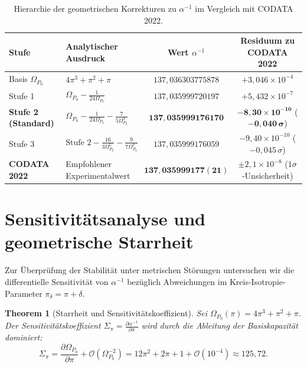 \documentclass[11pt,a4paper]{article}
\newtheorem{theorem}{Theorem}[section]
\begin{document}
\begin{table}[htbp]
\centering
\small
\caption{Hierarchie der geometrischen Korrekturen zu $\alpha^{-1}$ im Vergleich mit CODATA 2022.}
\label{tab:alpha_hierarchy}
\vspace{0.15cm}
\begin{tabular}{llcc}
\toprule
\textbf{Stufe} & \textbf{Analytischer Ausdruck} & \textbf{Wert $\alpha^{-1}$} & \textbf{Residuum zu CODATA 2022} \\
\midrule
Basis $\Omega_{P_0}$ & $4\pi^3 + \pi^2 + \pi$ & $137{,}036303775878$ & $+3{,}046 \times 10^{-4}$ \\
Stufe 1 & $\Omega_{P_0} - \frac{1}{24\Omega_{P_0}}$ & $137{,}035999720197$ & $+5{,}432 \times 10^{-7}$ \\
\textbf{Stufe 2 (Standard)} & $\Omega_{P_0} - \frac{1}{24\Omega_{P_0}} - \frac{7}{5\Omega_{P_0}^3}$ & $\mathbf{137{,}035999176170}$ & $\mathbf{-8{,}30 \times 10^{-10}}$ ($\mathbf{-0{,}040\,\sigma}$) \\
Stufe 3 & $\text{Stufe 2} - \frac{16}{3\Omega_{P_0}^5} - \frac{9}{7\Omega_{P_0}^7}$ & $137{,}035999176059$ & $-9{,}40 \times 10^{-10}$ ($-0{,}045\,\sigma$) \\
\midrule
\textbf{CODATA 2022} & Empfohlener Experimentalwert & $\mathbf{137{,}035999177(21)}$ & $\pm 2{,}1 \times 10^{-8}$ ($1\sigma$-Unsicherheit) \\
\bottomrule
\end{tabular}
\end{table}

\section{Sensitivitätsanalyse und geometrische Starrheit}\label{sec:rigidity}
Zur Überprüfung der Stabilität unter metrischen Störungen untersuchen wir die differentielle Sensitivität von $\alpha^{-1}$ bezüglich Abweichungen im Kreis-Isotropie-Parameter $\pi_\delta = \pi + \delta$.

\begin{theorem}[Starrheit und Sensitivitätskoeffizient]
Sei $\Omega_{P_0}(\pi) = 4\pi^3 + \pi^2 + \pi$. Der Sensitivitätskoeffizient $\Sigma_\pi = \frac{\partial \alpha^{-1}}{\partial \pi}$ wird durch die Ableitung der Basiskapazität dominiert:
\begin{equation}
\Sigma_\pi = \frac{\partial \Omega_{P_0}}{\partial \pi} + \mathcal{O}(\Omega_{P_0}^{-2}) = 12\pi^2 + 2\pi + 1 + \mathcal{O}(10^{-4}) \approx 125{,}72.
\end{equation}
\end{theorem}
\end{document}
